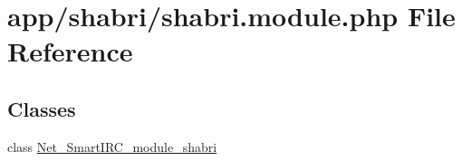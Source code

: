 \hypertarget{shabri_8module_8php}{}\section{app/shabri/shabri.module.\+php File Reference}
\label{shabri_8module_8php}
\subsection*{Classes}
\begin{DoxyCompactItemize}
\item 
class \hyperlink{classNet__SmartIRC__module__shabri}{Net\+\_\+\+Smart\+I\+R\+C\+\_\+module\+\_\+shabri}
\end{DoxyCompactItemize}
